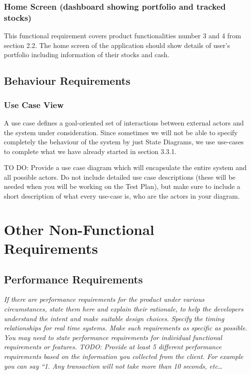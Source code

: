 \documentclass[12 pt, a4paper]{report}
\begin{document}
	
	\subsection{Home Screen (dashboard showing portfolio and tracked stocks)}
	This functional requirement covers product functionalities number 3 and 4 from section 2.2. The home screen of the application should show details of user's portfolio including information of their stocks and cash.

	\section {Behaviour Requirements}

	\subsection {Use Case View}
	A use case defines a goal-oriented set of interactions between external actors and the system under consideration. Since sometimes we will not be able to specify completely the behaviour of the system by just State Diagrams, we use use-cases to complete what we have already started in section 3.3.1. 
	
	TO DO: Provide a use case diagram which will encapsulate the entire system and all possible actors. Do not include detailed use case descriptions (these will be needed when you will be working on the Test Plan), but make sure to include a short description of what every use-case is, who are the actors in your diagram.
	
	\chapter {Other Non-Functional Requirements}
	\section {Performance Requirements}
	\textit{If there are performance requirements for the product under various circumstances, state them here and explain their rationale, to help the developers understand the intent and make suitable design choices. Specify the timing relationships for real time systems. Make such requirements as specific as possible. You may need to state performance requirements for individual functional requirements or features. 
	TODO: Provide at least 5 different performance requirements based on the information you collected from the client. For example you can say “1. Any transaction will not take more than 10 seconds, etc…}
\end{document}
